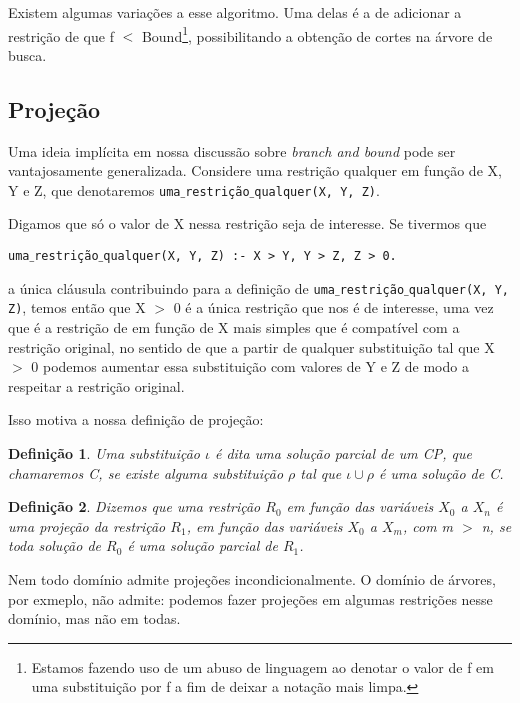\documentclass{article}
\newtheorem{definition}{Definição}[section]
\theoremstyle{remark}
\theoremstyle{theorem}
\begin{document}
Existem algumas variações a esse algoritmo. Uma delas é a de adicionar a restrição de que f $<$ Bound\footnote{Estamos fazendo uso de um abuso de linguagem ao denotar o valor de f em uma substituição por f a fim de deixar a notação mais limpa.}, possibilitando a obtenção de cortes na árvore de busca.

\subsection{Projeção}

Uma ideia implícita em nossa discussão sobre \textit{branch and bound} pode ser vantajosamente generalizada. Considere uma restrição qualquer em função de X, Y e Z, que denotaremos {\tt uma$\_$restrição$\_$qualquer(X, Y, Z)}.

Digamos que só o valor de X nessa restrição seja de interesse. Se tivermos que

{\tt uma$\_$restrição$\_$qualquer(X, Y, Z) :- X > Y, Y > Z, Z > 0.}

 a única cláusula contribuindo para a definição de {\tt uma$\_$restrição$\_$qualquer(X, Y, Z)}, temos então que X $>$ 0
é a única restrição que nos é de interesse, uma vez que é a restrição de em função de X mais simples que é compatível com a restrição original, no sentido de que a partir de qualquer substituição tal que X $>$ 0 podemos aumentar essa substituição com valores de Y e Z de modo a respeitar a restrição original.

Isso motiva a nossa definição de projeção:

\begin{definition}
  Uma substituição $\iota$ é dita uma solução parcial de um CP, que chamaremos C, se existe alguma substituição $\rho$ tal que $\iota \cup \rho$ é uma solução de C.
\end{definition}

\begin{definition}
  Dizemos que uma restrição $R_0$ em função das variáveis $X_0$ a $X_n$ é uma projeção da restrição $R_1$, em função das variáveis $X_0$ a $X_m$, com m $>$ n, se toda solução de $R_0$ é uma solução parcial de $R_1$.
\end{definition}

Nem todo domínio admite projeções incondicionalmente. O domínio de árvores, por exmeplo, não admite: podemos fazer projeções em algumas restrições nesse domínio, mas não em todas.
\end{document}
